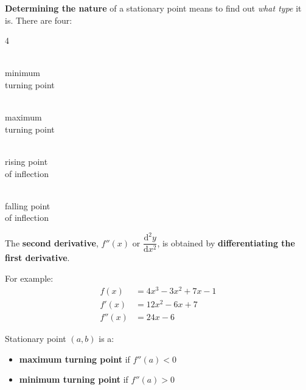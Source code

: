 \documentclass[
  11pt,
  openany]{book}
\begin{document}
\textbf{Determining the nature} of a stationary point means to find out \textit{what type} it is. There are four:

\begin{multicols}{4}
\begin{center}
    \\
    minimum\\
    turning point
    \\
    maximum\\
    turning point
    \\
    rising point\\
    of inflection
    \\
    falling point\\
    of inflection
\end{center}
\end{multicols}

\vspace{-0.5cm}

The \textbf{second derivative}, \(f''(x)\) or \(\dfrac{\text{d}^2 y}{\text{d}x^2}\), is obtained by \textbf{differentiating the first derivative}.

For example:
\vspace{-0.5cm}
\begin{align*}
    f(x)&=4x^3-3x^2+7x-1\\
    f'(x)&=12x^2-6x+7\\
    f''(x)&=24x-6
\end{align*}
\vspace{-0.7cm}

\begin{center}
\begin{tcolorbox}[colback=red!5,width=15cm,colframe=red!70!black]
Stationary point $(a,b)$ is a:
\vspace{-0.5cm}
\begin{itemize}[leftmargin=6cm]
    \item \textbf{maximum turning point} if $f''(a)<0$
    \item \textbf{minimum turning point} if $f''(a)>0$
\end{itemize}
\end{tcolorbox}
\end{center}
\end{document}
